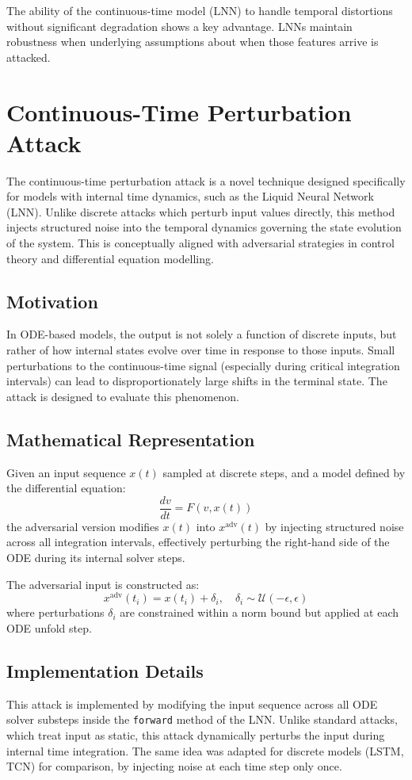 The ability of the continuous-time model (LNN) to handle temporal distortions without significant degradation shows a key advantage. LNNs maintain robustness when underlying assumptions about when those features arrive is attacked.

\section{Continuous-Time Perturbation Attack}

The continuous-time perturbation attack is a novel technique designed specifically for models with internal time dynamics, such as the Liquid Neural Network (LNN). Unlike discrete attacks which perturb input values directly, this method injects structured noise into the temporal dynamics governing the state evolution of the system. This is conceptually aligned with adversarial strategies in control theory and differential equation modelling.

\subsection*{Motivation}
In ODE-based models, the output is not solely a function of discrete inputs, but rather of how internal states evolve over time in response to those inputs. Small perturbations to the continuous-time signal (especially during critical integration intervals) can lead to disproportionately large shifts in the terminal state. The attack is designed to evaluate this phenomenon.

\subsection*{Mathematical Representation}
Given an input sequence $x(t)$ sampled at discrete steps, and a model defined by the differential equation:
\[
\frac{dv}{dt} = F(v, x(t))
\]
the adversarial version modifies $x(t)$ into $x^{\text{adv}}(t)$ by injecting structured noise across all integration intervals, effectively perturbing the right-hand side of the ODE during its internal solver steps.

The adversarial input is constructed as:
\[
x^{\text{adv}}(t_i) = x(t_i) + \delta_i, \quad \delta_i \sim \mathcal{U}(-\epsilon, \epsilon)
\]
where perturbations $\delta_i$ are constrained within a norm bound but applied at each ODE unfold step.

\subsection*{Implementation Details}
This attack is implemented by modifying the input sequence across all ODE solver substeps inside the \texttt{forward} method of the LNN. Unlike standard attacks, which treat input as static, this attack dynamically perturbs the input during internal time integration. The same idea was adapted for discrete models (LSTM, TCN) for comparison, by injecting noise at each time step only once.

